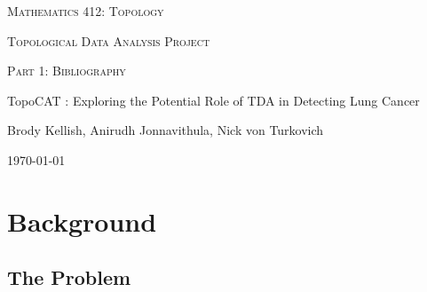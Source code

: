 \documentclass[12pt]{report}
\begin{document}

\begin{titlepage}
	\centering
	
{\scshape\LARGE Mathematics 412: Topology \par}
	{\scshape\Large Topological Data Analysis Project\par}
	{\scshape\Large Part 1: Bibliography\par}
	\vspace{1.5cm}
	{\Large TopoCAT : Exploring the Potential Role of TDA in Detecting Lung Cancer\par}
	{\vspace{2cm}}
	
	{\normalsize Brody Kellish, Anirudh Jonnavithula, Nick von Turkovich\par}
	\vfill


	{\large \today\par}
\end{titlepage}
\newpage

\tableofcontents{}

\part{Background}
\chapter{The Problem}
\end{document}
